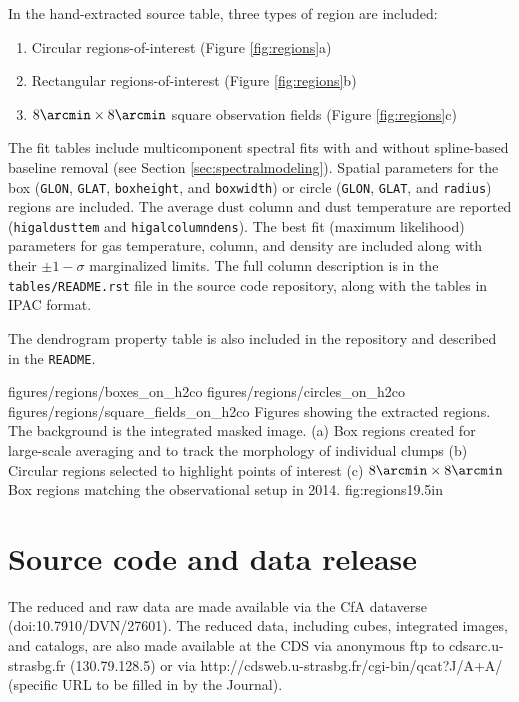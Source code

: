 In the hand-extracted source table, three types of region are included: 
\begin{enumerate}
    \item Circular regions-of-interest (Figure \ref{fig:regions}a)
    \item Rectangular regions-of-interest (Figure \ref{fig:regions}b)
    \item $8\arcmin \times 8\arcmin$ square observation fields (Figure \ref{fig:regions}c)
\end{enumerate}
The fit tables include multicomponent spectral fits with and without
spline-based baseline removal (see Section \ref{sec:spectralmodeling}).
Spatial parameters for the box (\texttt{GLON}, \texttt{GLAT},
\texttt{boxheight}, and \texttt{boxwidth}) or circle (\texttt{GLON},
\texttt{GLAT}, and \texttt{radius}) regions are included.  The average dust
column and dust temperature are reported (\texttt{higaldusttem} and
\texttt{higalcolumndens}).  The best fit (maximum likelihood) parameters for
gas temperature, \para column, and \hh density are included along with their
$\pm1-\sigma$ marginalized limits.  The full column description is in the
\texttt{tables/README.rst} file in the source code repository, along with the
tables in IPAC format.

The dendrogram property table is also included in the repository and described
in the \texttt{README}.

\RotFigureThreeAA
{figures/regions/boxes_on_h2co}
{figures/regions/circles_on_h2co}
{figures/regions/square_fields_on_h2co}
{Figures showing the extracted regions.  The background is the integrated
masked \para \threeohthree image. (a) Box regions created for large-scale averaging
and to track the morphology of individual clumps  (b) Circular regions selected
to highlight points of interest (c) $8\arcmin \times 8\arcmin$ Box regions
matching the observational setup in 2014.}
{fig:regions}{1}{9.5in}

\section{Source code and data release}
The reduced and raw data are made available via the CfA dataverse
(doi:10.7910/DVN/27601).  The reduced data, including cubes, integrated images,
and catalogs, are also made available at the CDS via anonymous ftp to
cdsarc.u-strasbg.fr (130.79.128.5) or via
http://cdsweb.u-strasbg.fr/cgi-bin/qcat?J/A+A/ (specific URL to be filled in by
the Journal).


